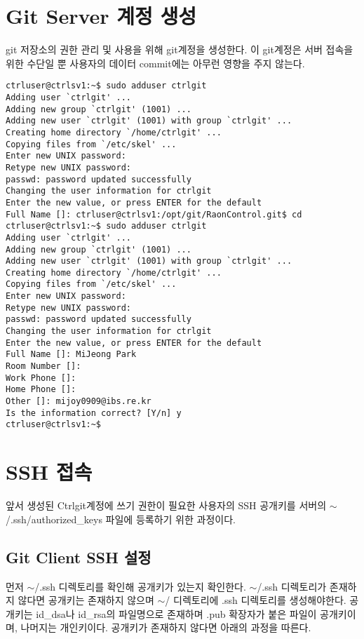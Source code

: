 \documentclass[11pt
  , a4paper
  , article
  , oneside
]{memoir}
\begin{document}
\chapter{Git Server 계정 생성}
git 저장소의 권한 관리 및 사용을 위해 git계정을 생성한다. 이 git계정은 서버 접속을 위한 수단일 뿐 사용자의 데이터 commit에는 아무런 영향을 주지 않는다.

\scriptsize
{
\begin{verbatim}
ctrluser@ctrlsv1:~$ sudo adduser ctrlgit
Adding user `ctrlgit' ...
Adding new group `ctrlgit' (1001) ...
Adding new user `ctrlgit' (1001) with group `ctrlgit' ...
Creating home directory `/home/ctrlgit' ...
Copying files from `/etc/skel' ...
Enter new UNIX password: 
Retype new UNIX password: 
passwd: password updated successfully
Changing the user information for ctrlgit
Enter the new value, or press ENTER for the default
Full Name []: ctrluser@ctrlsv1:/opt/git/RaonControl.git$ cd
ctrluser@ctrlsv1:~$ sudo adduser ctrlgit
Adding user `ctrlgit' ...
Adding new group `ctrlgit' (1001) ...
Adding new user `ctrlgit' (1001) with group `ctrlgit' ...
Creating home directory `/home/ctrlgit' ...
Copying files from `/etc/skel' ...
Enter new UNIX password: 
Retype new UNIX password: 
passwd: password updated successfully
Changing the user information for ctrlgit
Enter the new value, or press ENTER for the default
Full Name []: MiJeong Park
Room Number []: 
Work Phone []: 
Home Phone []: 
Other []: mijoy0909@ibs.re.kr
Is the information correct? [Y/n] y
ctrluser@ctrlsv1:~$ 
\end{verbatim}
}

\chapter{SSH 접속}
앞서 생성된 Ctrlgit계정에 쓰기 권한이 필요한 사용자의 SSH 공개키를 서버의 $\sim$/.ssh/authorized\_keys 파일에 등록하기 위한 과정이다.

\section{Git Client SSH 설정}
먼저 $\sim$/.ssh 디렉토리를 확인해 공개키가 있는지 확인한다. $\sim$/.ssh 디렉토리가 존재하지 않다면 공개키는 존재하지 않으며 $\sim$/ 디렉토리에 .ssh 디렉토리를 생성해야한다. 공개키는 id\_dsa나 id\_rsa의 파일명으로 존재하며 .pub 확장자가 붙은 파일이 공개키이며, 나머지는 개인키이다. 공개키가 존재하지 않다면 아래의 과정을 따른다.
\end{document}
